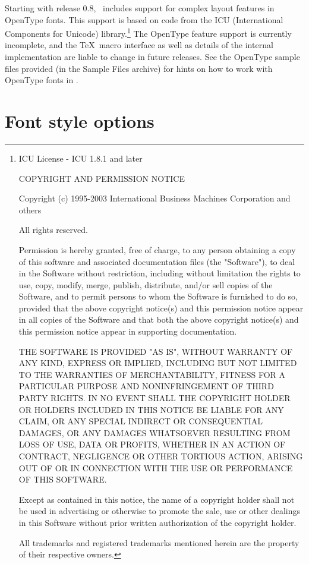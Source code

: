 Starting with release 0.8, \XeTeX\ includes  support for complex layout features in OpenType fonts. This support is based on code from the ICU (International Components for Unicode) library.\footnote{ICU License - ICU 1.8.1 and later

COPYRIGHT AND PERMISSION NOTICE

Copyright (c) 1995-2003 International Business Machines Corporation and others

All rights reserved.

Permission is hereby granted, free of charge, to any person obtaining a
copy of this software and associated documentation files (the
"Software"), to deal in the Software without restriction, including
without limitation the rights to use, copy, modify, merge, publish,
distribute, and/or sell copies of the Software, and to permit persons
to whom the Software is furnished to do so, provided that the above
copyright notice(s) and this permission notice appear in all copies of
the Software and that both the above copyright notice(s) and this
permission notice appear in supporting documentation.

THE SOFTWARE IS PROVIDED "AS IS", WITHOUT WARRANTY OF ANY KIND, EXPRESS
OR IMPLIED, INCLUDING BUT NOT LIMITED TO THE WARRANTIES OF
MERCHANTABILITY, FITNESS FOR A PARTICULAR PURPOSE AND NONINFRINGEMENT
OF THIRD PARTY RIGHTS. IN NO EVENT SHALL THE COPYRIGHT HOLDER OR
HOLDERS INCLUDED IN THIS NOTICE BE LIABLE FOR ANY CLAIM, OR ANY SPECIAL
INDIRECT OR CONSEQUENTIAL DAMAGES, OR ANY DAMAGES WHATSOEVER RESULTING
FROM LOSS OF USE, DATA OR PROFITS, WHETHER IN AN ACTION OF CONTRACT,
NEGLIGENCE OR OTHER TORTIOUS ACTION, ARISING OUT OF OR IN CONNECTION
WITH THE USE OR PERFORMANCE OF THIS SOFTWARE.

Except as contained in this notice, the name of a copyright holder
shall not be used in advertising or otherwise to promote the sale, use
or other dealings in this Software without prior written authorization
of the copyright holder.

All trademarks and registered trademarks mentioned herein are the property of their respective owners.}
The OpenType feature support is currently incomplete, and the \TeX\ macro interface as well as details of the internal implementation are liable to change in future releases. See the OpenType sample files provided (in the Sample Files archive) for hints on how to work with OpenType fonts in \XeTeX.



\section{Font style options}

